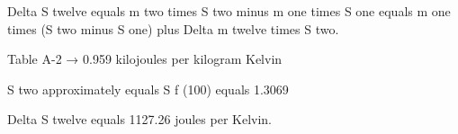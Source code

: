 Delta S twelve equals m two times S two minus m one times S one equals m one times (S two minus S one) plus Delta m twelve times S two.  

Table A-2 → 0.959 kilojoules per kilogram Kelvin  

S two approximately equals S f (100) equals 1.3069  

Delta S twelve equals 1127.26 joules per Kelvin.